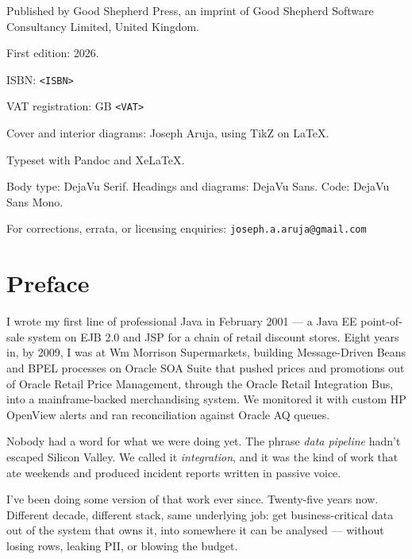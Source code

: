 \documentclass[
  11pt,
  british,
  oneside]{book}
\begin{document}
\noindent Published by Good Shepherd Press, an imprint of Good Shepherd
Software Consultancy Limited, United Kingdom.

\noindent First edition: 2026.

\noindent ISBN: \texttt{<ISBN>}

\noindent VAT registration: GB \texttt{<VAT>}

\vspace{0.5cm}

\noindent Cover and interior diagrams: Joseph Aruja, using
TikZ on \LaTeX.

\noindent Typeset with Pandoc and Xe\LaTeX.

\noindent Body type: DejaVu Serif. Headings and diagrams: DejaVu Sans.
Code: DejaVu Sans Mono.

\vspace{1cm}

\noindent For corrections, errata, or licensing enquiries:
\texttt{joseph.a.aruja@gmail.com}

\vspace*{\fill}

\newpage

\hypertarget{preface}{%
\chapter{Preface}\label{preface}}

I wrote my first line of professional Java in February 2001 --- a Java
EE point-of-sale system on EJB 2.0 and JSP for a chain of retail
discount stores. Eight years in, by 2009, I was at Wm Morrison
Supermarkets, building Message-Driven Beans and BPEL processes on Oracle
SOA Suite that pushed prices and promotions out of Oracle Retail Price
Management, through the Oracle Retail Integration Bus, into a
mainframe-backed merchandising system. We monitored it with custom HP
OpenView alerts and ran reconciliation against Oracle AQ queues.

Nobody had a word for what we were doing yet. The phrase \emph{data
pipeline} hadn't escaped Silicon Valley. We called it
\emph{integration}, and it was the kind of work that ate weekends and
produced incident reports written in passive voice.

I've been doing some version of that work ever since. Twenty-five years
now. Different decade, different stack, same underlying job: get
business-critical data out of the system that owns it, into somewhere it
can be analysed --- without losing rows, leaking PII, or blowing the
budget.
\end{document}

